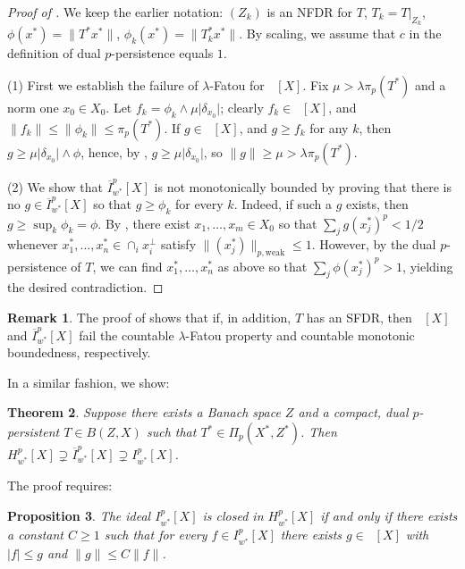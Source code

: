 \documentclass{amsart}
\theoremstyle{plain}
\newtheorem{theorem}{Theorem}[section]
\newtheorem{proposition}[theorem]{Proposition}
\theoremstyle{definition}
\newtheorem{remark}[theorem]{Remark}
\numberwithin{equation}{section}
\DeclareMathOperator{\FBLp}{FBL^{\mathit{(p)}}}
\newcommand{\Hp}{H_{w^*}^{p}}
\newcommand{\nip}{I_{w^*}^{p}}
\newcommand{\Ip}{\overline{I}_{w^*}^{p}}
\begin{document}
\begin{proof}[Proof of ]
We keep the earlier notation: $(Z_k)$ is an NFDR for $T$, $T_k = T|_{Z_k}$, $\phi(x^*) = \|T^* x^*\|$, $\phi_k(x^*) = \|T_k^* x^*\|$. By scaling, we assume that $c$ in the definition of dual $p$-persistence equals $1$.

(1) First we establish the failure of $\lambda$-Fatou for $\FBLp[X]$. Fix $\mu > \lambda \pi_p(T^*)$ and a norm one $x_0 \in X_0$. Let $f_k = \phi_k \wedge \mu \big| \delta_{x_0} \big|$; clearly $f_k \in \FBLp[X]$, and $\|f_k\| \leq \|\phi_k\| \leq \pi_p(T^*)$.
If $g \in \FBLp[X]$, and $g \geq f_k$ for any $k$, then $g \geq \mu \big| \delta_{x_0} \big| \wedge \phi$, hence, by , $g \geq \mu \big| \delta_{x_0} \big|$, so $\|g\| \geq \mu > \lambda \pi_p(T^*)$.

(2) We show that $\Ip[X]$ is not monotonically bounded by proving that there is no $g \in \Ip[X]$ so that $g \geq \phi_k$ for every $k$.
Indeed, if such a $g$ exists, then $g \geq \sup_k \phi_k = \phi$. By , there exist $x_1, \ldots, x_m \in X_0$ so that $\sum_j g(x_j^*)^p < 1/2$ whenever $x_1^*, \ldots, x_n^* \in \cap_i x_i^\perp$ satisfy $\|(x_j^*)\|_{p,{\textrm{weak}}} \leq 1$.
However, by the dual $p$-persistence of $T$, we can find $x_1^*, \ldots, x_n^*$ as above so that $\sum_j \phi(x_j^*)^p > 1$, yielding the desired contradiction.
\end{proof}


\begin{remark}
The proof of  shows that if, in addition, $T$ has an SFDR, then $\FBLp[X]$ and $\Ip[X]$ fail the countable $\lambda$-Fatou property and countable monotonic boundedness, respectively.
\end{remark}

In a similar fashion, we show:

\begin{theorem}\label{Ip not Hp general}
Suppose there exists a Banach space $Z$ and a compact, dual $p$-persistent $T \in B(Z, X)$ such that $T^* \in \Pi_p(X^*,Z^*)$. Then $\Hp[X] \supsetneq \Ip[X] \supsetneq \nip[X]$.
\end{theorem}

The proof requires:

\begin{proposition}\label{ideal is closed criterion}
The ideal $\nip[X]$ is closed in $\Hp[X]$ if and only if there exists a constant $C \geq 1$ such that for every $f \in \nip[X]$ there exists $g \in \FBLp[X]$ with $|f| \leq g$ and $\|g\| \leq C \|f\|$.
\end{proposition}
\end{document}
